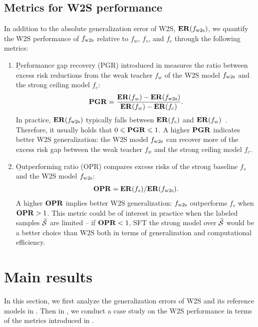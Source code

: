 \subsection{Metrics for W2S performance}\label{sec:w2s_metrics}
In addition to the absolute generalization error of W2S, $\mathbf{ER}(f_{\mathrm{w2s}})$, we quantify the W2S performance of $f_{\mathrm{w2s}}$ relative to $f_w$, $f_s$, and $f_c$ through the following metrics:
\begin{enumerate}[label=(\alph*)]
    \item \b{Performance gap recovery (PGR)} introduced in \cite{burns2023weak} measures the ratio between excess risk reductions from the weak teacher $f_w$ of the W2S model $f_{\mathrm{w2s}}$ and the strong ceiling model $f_c$:
    \begin{align}
        \mathbf{PGR} = \frac{\mathbf{ER}(f_w) - \mathbf{ER}(f_{\mathrm{w2s}})}{\mathbf{ER}(f_w) - \mathbf{ER}(f_c)}.
    \end{align}
    In practice, $\mathbf{ER}(f_{\mathrm{w2s}})$ typically falls between $\mathbf{ER}(f_c)$ and $\mathbf{ER}(f_w)$~\citep{burns2023weak}. Therefore, it usually holds that $0 \leqslant \mathbf{PGR} \leqslant 1$. A higher $\mathbf{PGR}$ indicates better W2S generalization: the W2S model $f_{\mathrm{w2s}}$ can recover more of the excess risk gap between the weak teacher $f_w$ and the strong ceiling model $f_c$.
    \item \b{Outperforming ratio (OPR)} compares excess risks of the strong baseline $f_s$ and the W2S model $f_{\mathrm{w2s}}$:
    \begin{align}\label{eq:w2s_gain}
        \mathbf{OPR} = \mathbf{ER}(f_s) / \mathbf{ER}(f_{\mathrm{w2s}}).
    \end{align}
    A higher $\mathbf{OPR}$ implies better W2S generalization: $f_{\mathrm{w2s}}$ outperforms $f_s$ when $\mathbf{OPR} > 1$. 
    This metric could be of interest in practice when the labeled samples $\widetilde{{\mathcal{S}}}$ are limited -- if $\mathbf{OPR} < 1$, SFT the strong model over $\widetilde{{\mathcal{S}}}$ would be a better choice than W2S both in terms of generalization and computational efficiency.
\end{enumerate}




\section{Main results}\label{sec:single_task_ft}
In this section, we first analyze the generalization errors of W2S and its reference models in . Then in , we conduct a case study on the W2S performance in terms of the metrics introduced in .

